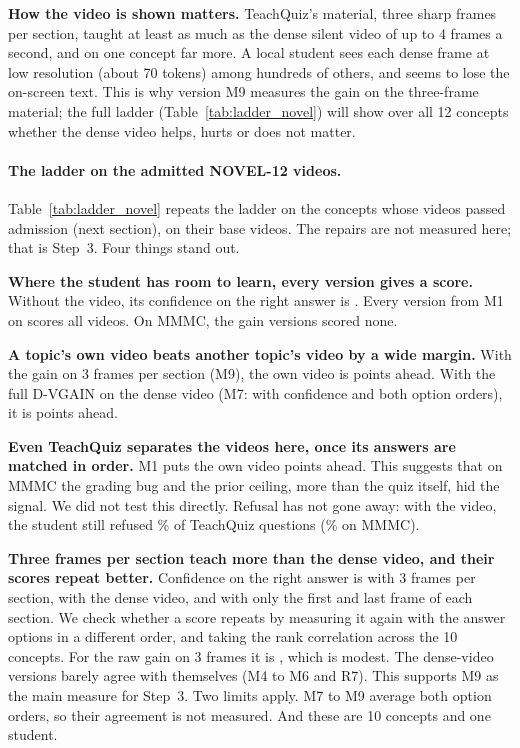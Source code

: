 \documentclass[11pt]{article}
\begin{document}
\textbf{How the video is shown matters.} TeachQuiz's material, three sharp frames per section, taught at least as
much as the dense silent video of up to 4 frames a second, and on one concept far more. A local student sees each
dense frame at low resolution (about 70 tokens) among hundreds of others, and seems to lose the on-screen text. This
is why version M9 measures the gain on the three-frame material; the full ladder (Table~\ref{tab:ladder_novel}) will show
over all 12 concepts whether the dense video helps, hurts or does not matter.




\paragraph{The ladder on the admitted NOVEL-12 videos.} Table~\ref{tab:ladder_novel} repeats the ladder on the
\LadNovelTopics{} concepts whose videos passed admission (next section), on their base videos. The repairs are not
measured here; that is Step~3. Four things stand out.

\textbf{Where the student has room to learn, every version gives a score.} Without the video, its confidence on the
right answer is \LadNovelSBlind{}. Every version from M1 on scores all \LadNovelVideos{} videos. On MMMC, the gain
versions scored none.

\textbf{A topic's own video beats another topic's video by a wide margin.} With the gain on 3 frames per section (M9),
the own video is \LadNovelSepNine{} points ahead. With the full D-VGAIN on the dense video (M7: with confidence and
both option orders), it is \LadNovelSepSeven{} points ahead.

\textbf{Even TeachQuiz separates the videos here, once its answers are matched in order.} M1 puts the own video
\LadNovelSepOne{} points ahead. This suggests that on MMMC the grading bug and the prior ceiling, more than the quiz
itself, hid the signal. We did not test this directly. Refusal has not gone away: with the video, the student still refused \LadNovelAbstained\% of
TeachQuiz questions (\NullWithVideo\% on MMMC).

\textbf{Three frames per section teach more than the dense video, and their scores repeat better.} Confidence on the
right answer is \LadNovelSFrames{} with 3 frames per section, \LadNovelSVisual{} with the dense video, and
\LadNovelSStatic{} with only the first and last frame of each section. We check whether a score repeats by measuring it
again with the answer options in a different order, and taking the rank correlation across the 10 concepts. For the
raw gain on 3 frames it is \LadNovelAgreeRawNine{}, which is modest. The dense-video versions barely agree with themselves (M4 to M6
and R7). This supports M9 as the main measure for Step~3. Two limits apply. M7 to M9 average both option orders, so
their agreement is not measured. And these are 10 concepts and one student.
\end{document}
